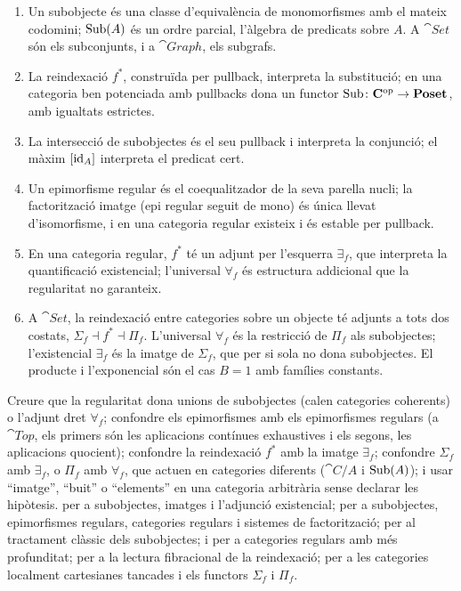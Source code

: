 \begin{resumcap}
\begin{enumerate}
  \item Un subobjecte és una classe d'equivalència de monomorfismes amb el mateix codomini; $\operatorname{Sub}(A)$ és un ordre parcial, l'àlgebra de predicats sobre $A$. A $\cat{Set}$ són els subconjunts, i a $\cat{Graph}$, els subgrafs.
  \item La reindexació $f^{*}$, construïda per pullback, interpreta la substitució; en una categoria ben potenciada amb pullbacks dona un functor $\operatorname{Sub}\colon\mathbf{C}^{\mathrm{op}}\to\mathbf{Poset}$, amb igualtats estrictes.
  \item La intersecció de subobjectes és el seu pullback i interpreta la conjunció; el màxim $[\operatorname{id}_A]$ interpreta el predicat cert.
  \item Un epimorfisme regular és el coequalitzador de la seva parella nucli; la factorització imatge (epi regular seguit de mono) és única llevat d'isomorfisme, i en una categoria regular existeix i és estable per pullback.
  \item En una categoria regular, $f^{*}$ té un adjunt per l'esquerra $\exists_f$, que interpreta la quantificació existencial; l'universal $\forall_f$ és estructura addicional que la regularitat no garanteix.
  \item A $\cat{Set}$, la reindexació entre categories sobre un objecte té adjunts a tots dos costats, $\Sigma_f\dashv f^{*}\dashv\Pi_f$. L'universal $\forall_f$ és la restricció de $\Pi_f$ als subobjectes; l'existencial $\exists_f$ és la imatge de $\Sigma_f$, que per si sola no dona subobjectes. El producte i l'exponencial són el cas $B=1$ amb famílies constants.
\end{enumerate}
 Creure que la regularitat dona unions de subobjectes (calen categories coherents) o l'adjunt dret $\forall_f$; confondre els epimorfismes amb els epimorfismes regulars (a $\cat{Top}$, els primers són les aplicacions contínues exhaustives i els segons, les aplicacions quocient); confondre la reindexació $f^{*}$ amb la imatge $\exists_f$; confondre $\Sigma_f$ amb $\exists_f$, o $\Pi_f$ amb $\forall_f$, que actuen en categories diferents ($\cat{C}/A$ i $\operatorname{Sub}(A)$); i usar \enquote{imatge}, \enquote{buit} o \enquote{elements} en una categoria arbitrària sense declarar les hipòtesis.
 \cite[cap.~5 i~\S9.5]{awodey} per a subobjectes, imatges i l'adjunció existencial; \cite[§§2.8, 2.10, 9.4 i 9.8]{barrwells} per a subobjectes, epimorfismes regulars, categories regulars i sistemes de factorització; \cite[V.7]{maclane} per al tractament clàssic dels subobjectes; \cite[A1.3]{johnstone} i \cite{borceux} per a categories regulars amb més profunditat; \cite{jacobs} per a la lectura fibracional de la reindexació; \cite[§9.7]{awodey} per a les categories localment cartesianes tancades i els functors $\Sigma_f$ i $\Pi_f$.
\end{resumcap}
